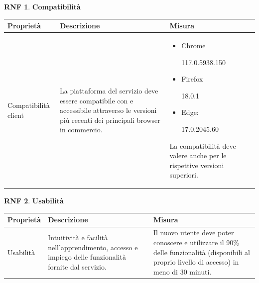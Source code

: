 \documentclass[11pt, a4paper]{article}
\theoremstyle{definition}
\newtheorem{nonfuncreq}{RNF} %
\begin{document}
\begin{nonfuncreq}
    \textbf{Compatibilità }
    \begin{center}
        \footnotesize
        \begin{tabularx}{\textwidth}{|X||X||X|}
            \hline
            \cellcolor{red!70}Proprietà & \cellcolor{red!70}Descrizione & \cellcolor{red!70}Misura\\
            \hline
            Compatibilità client & La piattaforma del servizio deve essere compatibile con e accessibile attraverso le versioni più recenti dei principali browser in commercio. &
            \begin{itemize}
                \item Chrome
                
                117.0.5938.150
                \item Firefox
                
                18.0.1
                \item Edge:
                
                17.0.2045.60
            \end{itemize}La compatibilità deve valere anche per le rispettive versioni superiori.\\
            \hline
        \end{tabularx}
    \end{center}
\end{nonfuncreq}

\begin{nonfuncreq}
    \textbf{Usabilità }
    \begin{center}
        \footnotesize
        \begin{tabularx}{\textwidth}{|X||X||X|}
            \hline
            \cellcolor{red!70}Proprietà & \cellcolor{red!70}Descrizione & \cellcolor{red!70}Misura\\
            \hline
            Usabilità & Intuitività e facilità nell'apprendimento, accesso e impiego delle funzionalità fornite dal servizio. & Il nuovo utente deve poter conoscere e utilizzare il 90\% delle funzionalità (disponibili al proprio livello di accesso) in meno di 30 minuti.\\
            \hline
        \end{tabularx}
    \end{center}
\end{nonfuncreq}
\end{document}
